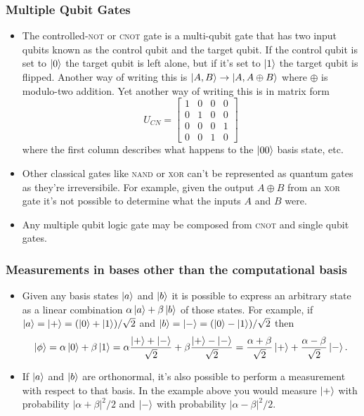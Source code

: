 \documentclass{article}
\begin{document}
\subsubsection{Multiple Qubit Gates}

\begin{itemize}
  \item The controlled-\textsc{not} or \textsc{cnot} gate is a multi-qubit gate that has two input qubits known as the control qubit and the target qubit. If the control qubit is set to $\ket{0}$ the target qubit is left alone, but if it's set to $\ket{1}$ the target qubit is flipped. Another way of writing this is $\ket{A, B} \rightarrow \ket{A, A \oplus B}$ where $\oplus$ is modulo-two addition. Yet another way of writing this is in matrix form \[U_{CN} = \begin{bmatrix}
            1 & 0 & 0 & 0 \\
            0 & 1 & 0 & 0 \\
            0 & 0 & 0 & 1 \\
            0 & 0 & 1 & 0
          \end{bmatrix}\] where the first column describes what happens to the $\ket{00}$ basis state, etc.

  \item Other classical gates like \textsc{nand} or \textsc{xor} can't be represented as quantum gates as they're irreversibile. For example, given the output $A \oplus B$ from an \textsc{xor} gate it's not possible to determine what the inputs $A$ and $B$ were.

  \item Any multiple qubit logic gate may be composed from \textsc{cnot} and single qubit gates.
\end{itemize}

\subsubsection{Measurements in bases other than the computational basis}

\begin{itemize}
  \item Given any basis states $\ket{a}$ and $\ket{b}$ it is possible to express an arbitrary state as a linear combination $\alpha \ket{a} + \beta \ket{b}$ of those states. For example, if $\ket{a} = \ket{+} = (\ket{0} + \ket{1}) / \sqrt{2}$ and $\ket{b} = \ket{-} = (\ket{0} - \ket{1}) / \sqrt{2}$ then \[\ket{\phi} = \alpha \ket{0} + \beta \ket{1} = \alpha \frac{\ket{+} + \ket{-}}{\sqrt{2}} + \beta \frac{\ket{+} - \ket{-}}{\sqrt{2}} = \frac{\alpha + \beta}{\sqrt{2}} \ket{+} + \frac{\alpha - \beta}{\sqrt{2}} \ket{-}.\]

  \item If $\ket{a}$ and $\ket{b}$ are orthonormal, it's also possible to perform a measurement with respect to that basis. In the example above you would measure $\ket{+}$ with probability $|\alpha + \beta|^2 / 2$ and $\ket{-}$ with probability $|\alpha - \beta|^2 / 2$.
\end{itemize}
\end{document}
